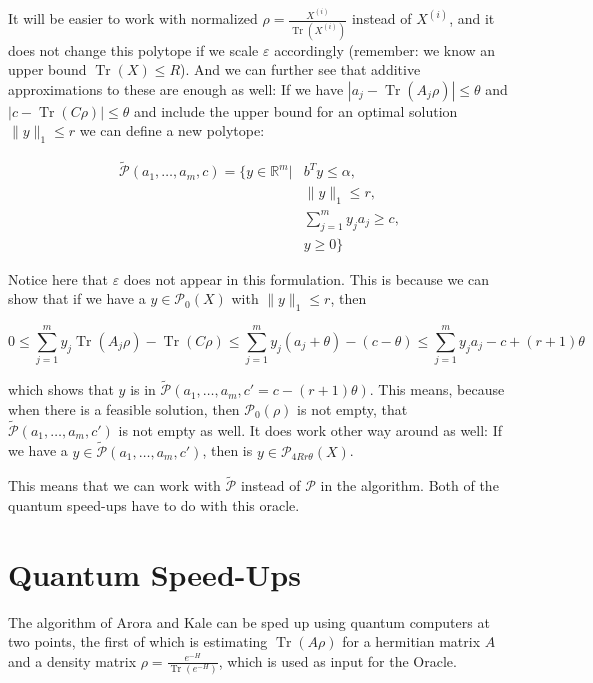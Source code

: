 \documentclass[11pt,a4paper]{scrartcl}
\DeclareMathOperator{\Tr}{Tr}
\newcommand{\R}{\mathbb{R}}
\begin{document}
It will be easier to work with normalized $\rho=\frac{X^{(i)}}{\Tr(X^{(i)})}$ instead of $X^{(i)}$, and it does not change this polytope if we scale $\varepsilon$ accordingly (remember: we know an upper bound $\Tr(X)\leq R$). And we can further see that additive approximations to these are enough as well: If we have $|a_j-\Tr(A_j\rho)|\leq \theta$ and $|c-\Tr(C\rho)|\leq \theta$ and include the upper bound for an optimal solution $\|y\|_1\leq r$ we can define a new polytope:

\begin{align*}
\tilde{\mathcal{P}}(a_1,\ldots, a_m,c)=\{y\in\R^m | &b^Ty\leq\alpha,\\
&\|y\|_1\leq r,\\
 &\sum_{j=1}^m y_j a_j\geq c,\\
 & y\geq 0\}
\end{align*}

Notice here that $\varepsilon$ does not appear in this formulation. This is because we can show that if we have a $y\in\mathcal{P}_0(X)$ with $\|y\|_1\leq r$, then

\begin{equation*}
0\leq \sum_{j=1}^m y_j \Tr(A_j\rho)-\Tr(C\rho) \leq \sum_{j=1}^m y_j (a_j+\theta)-(c-\theta) \leq  \sum_{j=1}^m y_j a_j-c +(r+1)\theta
\end{equation*}

which shows that $y$ is in $\tilde{\mathcal{P}}(a_1,\ldots,a_m, c'=c-(r+1)\theta)$. This means, because when there is a feasible solution, then $\mathcal{P}_0(\rho)$ is not empty, that $\tilde{\mathcal{P}}(a_1,\ldots,a_m, c')$ is not empty as well. It does work other way around as well: If we have a $y\in\tilde{\mathcal{P}}(a_1,\ldots,a_m, c')$, then is $y\in \mathcal{P}_{4Rr\theta}(X)$.

This means that we can work with $\tilde{\mathcal{P}}$ instead of $\mathcal{P}$ in the algorithm. Both of the quantum speed-ups have to do with this oracle.

\section{Quantum Speed-Ups}

The algorithm of Arora and Kale can be sped up using quantum computers at two points, the first of which is estimating $\Tr(A\rho)$ for a hermitian matrix $A$ and a density matrix $\rho = \frac{e^{-H}}{\Tr(e^{-H})}$, which is used as input for the Oracle.
\end{document}
